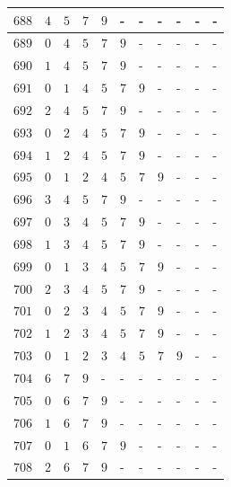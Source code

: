 \begin{appendices}
\begin{table}[H]
\begin{tabular} {|l|l|l|l|l|l|l|l|l|l|l|}
  		$ 688 $ & $ 4 $ &$ 5 $ &$ 7 $ &$ 9 $ & - &  - &  - &  - &  - &  -   \\ \hline
  		$ 689 $ & $ 0 $ &$ 4 $ &$ 5 $ &$ 7 $ &$ 9 $ & - &  - &  - &  - &  -   \\ \hline
  		$ 690 $ & $ 1 $ &$ 4 $ &$ 5 $ &$ 7 $ &$ 9 $ & - &  - &  - &  - &  -   \\ \hline
  		$ 691 $ & $ 0 $ &$ 1 $ &$ 4 $ &$ 5 $ &$ 7 $ &$ 9 $ & - &  - &  - &  -   \\ \hline
  		$ 692 $ & $ 2 $ &$ 4 $ &$ 5 $ &$ 7 $ &$ 9 $ & - &  - &  - &  - &  -   \\ \hline
  		$ 693 $ & $ 0 $ &$ 2 $ &$ 4 $ &$ 5 $ &$ 7 $ &$ 9 $ & - &  - &  - &  -   \\ \hline
  		$ 694 $ & $ 1 $ &$ 2 $ &$ 4 $ &$ 5 $ &$ 7 $ &$ 9 $ & - &  - &  - &  -   \\ \hline
  		$ 695 $ & $ 0 $ &$ 1 $ &$ 2 $ &$ 4 $ &$ 5 $ &$ 7 $ &$ 9 $ & - &  - &  -   \\ \hline
  		$ 696 $ & $ 3 $ &$ 4 $ &$ 5 $ &$ 7 $ &$ 9 $ & - &  - &  - &  - &  -   \\ \hline
  		$ 697 $ & $ 0 $ &$ 3 $ &$ 4 $ &$ 5 $ &$ 7 $ &$ 9 $ & - &  - &  - &  -   \\ \hline
  		$ 698 $ & $ 1 $ &$ 3 $ &$ 4 $ &$ 5 $ &$ 7 $ &$ 9 $ & - &  - &  - &  -   \\ \hline
  		$ 699 $ & $ 0 $ &$ 1 $ &$ 3 $ &$ 4 $ &$ 5 $ &$ 7 $ &$ 9 $ & - &  - &  -   \\ \hline
  		$ 700 $ & $ 2 $ &$ 3 $ &$ 4 $ &$ 5 $ &$ 7 $ &$ 9 $ & - &  - &  - &  -   \\ \hline
  		$ 701 $ & $ 0 $ &$ 2 $ &$ 3 $ &$ 4 $ &$ 5 $ &$ 7 $ &$ 9 $ & - &  - &  -   \\ \hline
  		$ 702 $ & $ 1 $ &$ 2 $ &$ 3 $ &$ 4 $ &$ 5 $ &$ 7 $ &$ 9 $ & - &  - &  -   \\ \hline
  		$ 703 $ & $ 0 $ &$ 1 $ &$ 2 $ &$ 3 $ &$ 4 $ &$ 5 $ &$ 7 $ &$ 9 $ & - &  -   \\ \hline
  		$ 704 $ & $ 6 $ &$ 7 $ &$ 9 $ & - &  - &  - &  - &  - &  - &  -   \\ \hline
  		$ 705 $ & $ 0 $ &$ 6 $ &$ 7 $ &$ 9 $ & - &  - &  - &  - &  - &  -   \\ \hline
  		$ 706 $ & $ 1 $ &$ 6 $ &$ 7 $ &$ 9 $ & - &  - &  - &  - &  - &  -   \\ \hline
  		$ 707 $ & $ 0 $ &$ 1 $ &$ 6 $ &$ 7 $ &$ 9 $ & - &  - &  - &  - &  -   \\ \hline
  		$ 708 $ & $ 2 $ &$ 6 $ &$ 7 $ &$ 9 $ & - &  - &  - &  - &  - &  -   \\ \hline

\end{tabular}
\end{table}
\end{appendices}
